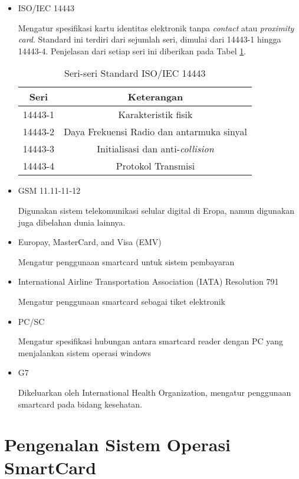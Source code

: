 \documentclass[a4paper, 12pt]{report}
\begin{document}
\begin{itemize}
\item ISO/IEC 14443

Mengatur spesifikasi kartu identitas elektronik tanpa \emph{contact} atau \emph{proximity card}. Standard ini terdiri dari sejumlah seri, dimulai dari 14443-1 hingga 14443-4. Penjelasan dari setiap seri ini diberikan pada Tabel \ref{tabel-standard-14443}.

\begin{table}[!h]
  \centering
  \begin{tabular}{ | c | c |}
    \hline
    \bf{Seri} & \bf{Keterangan} \\
    \hline
    14443-1 & Karakteristik fisik \\
    14443-2 & Daya Frekuensi Radio dan antarmuka sinyal \\
    14443-3 & Initialisasi dan anti-\emph{collision} \\
    14443-4 & Protokol Transmisi \\
    \hline
  \end{tabular}
  \caption{Seri-seri Standard ISO/IEC 14443}
  \label{tabel-standard-14443}
\end{table}

\item GSM 11.11-11-12

Digunakan sistem telekomunikasi selular digital di Eropa, namun digunakan juga dibelahan dunia lainnya. 

\item Europay, MasterCard, and Visa (EMV)

Mengatur penggunaan smartcard untuk sistem pembayaran

\item International Airline Transportation Association (IATA) Resolution 791

Mengatur penggunaan smartcard sebagai tiket elektronik

\item PC/SC

Mengatur spesifikasi hubungan antara smartcard reader dengan PC yang menjalankan sistem operasi windows

\item G7

Dikeluarkan oleh International Health Organization, mengatur penggunaan smartcard pada bidang kesehatan.

\end{itemize}

\section{Pengenalan Sistem Operasi SmartCard}
\end{document}
